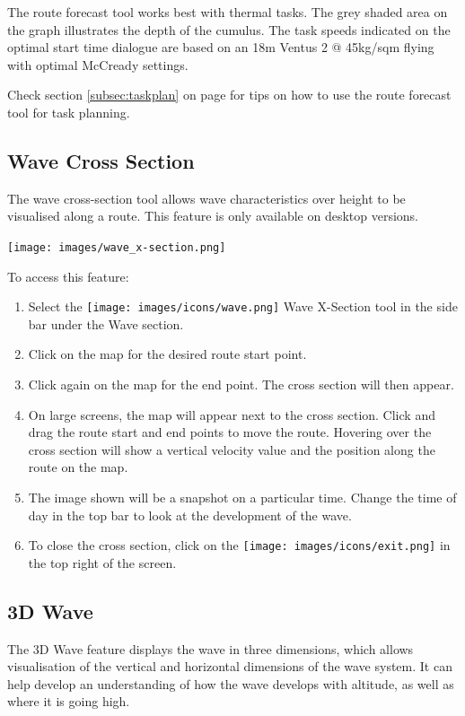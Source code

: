 \documentclass[11pt,a4paper]{article}
\begin{document}
The route forecast tool works best with thermal tasks. The grey shaded area on the graph illustrates the depth of the cumulus. The task speeds indicated on the optimal start time dialogue are based on an 18m Ventus 2 @ 45kg/sqm flying with optimal McCready settings. 
\begin{tip}
\item Check section \ref{subsec:taskplan} on page \pageref{subsec:taskplan} for tips on how to use the route forecast tool for task planning.
\end{tip}

\subsection{Wave Cross Section}
The wave cross-section tool allows wave characteristics over height to be visualised along a route. This feature is only available on desktop versions.
\begin{center}
\texttt{[image: images/wave\_x-section.png]}
\end{center}

To access this feature:
\begin{enumerate}
\item Select the \texttt{[image: images/icons/wave.png]} Wave X-Section tool in the side bar under the Wave section.
\item Click on the map for the desired route start point.
\item Click again on the map for the end point. The cross section will then appear.
\item On large screens, the map will appear next to the cross section. Click and drag the route start and end points to move the route. Hovering over the cross section will show a vertical velocity value and the position along the route on the map.
\item The image shown will be a snapshot on a particular time. Change the time of day in the top bar to look at the development of the wave.
\item To close the cross section, click on the \texttt{[image: images/icons/exit.png]} in the top right of the screen.
\end{enumerate}

\subsection{3D Wave}
The 3D Wave feature displays the wave in three dimensions, which allows visualisation of the vertical and horizontal dimensions of the wave system. It can help develop an understanding of how the wave develops with altitude, as well as where it is going high.
\end{document}

